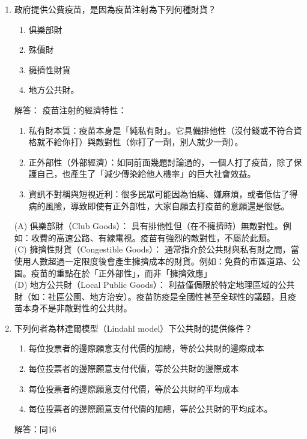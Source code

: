 \documentclass[12pt, a4paper]{article}
\begin{document}
\begin{enumerate}
    \item 政府提供公費疫苗，是因為疫苗注射為下列何種財貨？
    \begin{enumerate}[label=\Alph*.]
        \item 俱樂部財
        \item 殊價財
        \item 擁擠性財貨
        \item 地方公共財。
    \end{enumerate}
    解答：
    疫苗注射的經濟特性：
    \begin{enumerate}
        \item 私有財本質：疫苗本身是「純私有財」。它具備排他性（沒付錢或不符合資格就不給你打）與敵對性（你打了一劑，別人就少一劑）。
        \item 正外部性（外部經濟）：如同前面幾題討論過的，一個人打了疫苗，除了保護自己，也產生了「減少傳染給他人機率」的巨大社會效益。
        \item 資訊不對稱與短視近利：很多民眾可能因為怕痛、嫌麻煩，或者低估了得病的風險，導致即使有正外部性，大家自願去打疫苗的意願還是很低。
    \end{enumerate}
	(A) 俱樂部財（Club Goods）： 具有排他性但（在不擁擠時）無敵對性。例如：收費的高速公路、有線電視。疫苗有強烈的敵對性，不屬於此類。\\
    (C) 擁擠性財貨（Congestible Goods）： 通常指介於公共財與私有財之間，當使用人數超過一定限度後會產生擁擠成本的財貨。例如：免費的市區道路、公園。疫苗的重點在於「正外部性」，而非「擁擠效應」\\
    (D) 地方公共財（Local Public Goods）： 利益僅侷限於特定地理區域的公共財（如：社區公園、地方治安）。疫苗防疫是全國性甚至全球性的議題，且疫苗本身不是非敵對性的公共財。

    \item 下列何者為林達爾模型（Lindahl model）下公共財的提供條件？
    \begin{enumerate}[label=\Alph*.]
        \item 每位投票者的邊際願意支付代價的加總，等於公共財的邊際成本
        \item 每位投票者的邊際願意支付代價，等於公共財的邊際成本
        \item 每位投票者的邊際願意支付代價，等於公共財的平均成本
        \item 每位投票者的邊際願意支付代價的加總，等於公共財的平均成本。
    \end{enumerate}
    解答：同16


\end{enumerate}
\end{document}
